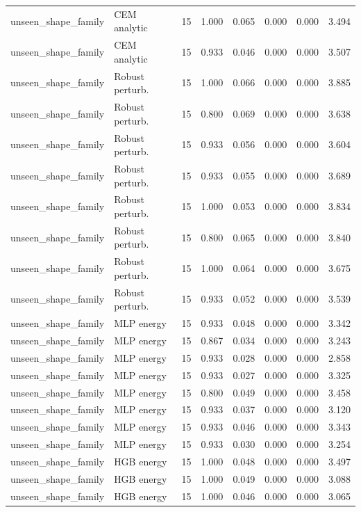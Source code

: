 {\begin{longtable}{llrrrrrr}
unseen\_shape\_family & CEM analytic & 15 & 1.000 & 0.065 & 0.000 & 0.000 & 3.494 \\
unseen\_shape\_family & CEM analytic & 15 & 0.933 & 0.046 & 0.000 & 0.000 & 3.507 \\
unseen\_shape\_family & Robust perturb. & 15 & 1.000 & 0.066 & 0.000 & 0.000 & 3.885 \\
unseen\_shape\_family & Robust perturb. & 15 & 0.800 & 0.069 & 0.000 & 0.000 & 3.638 \\
unseen\_shape\_family & Robust perturb. & 15 & 0.933 & 0.056 & 0.000 & 0.000 & 3.604 \\
unseen\_shape\_family & Robust perturb. & 15 & 0.933 & 0.055 & 0.000 & 0.000 & 3.689 \\
unseen\_shape\_family & Robust perturb. & 15 & 1.000 & 0.053 & 0.000 & 0.000 & 3.834 \\
unseen\_shape\_family & Robust perturb. & 15 & 0.800 & 0.065 & 0.000 & 0.000 & 3.840 \\
unseen\_shape\_family & Robust perturb. & 15 & 1.000 & 0.064 & 0.000 & 0.000 & 3.675 \\
unseen\_shape\_family & Robust perturb. & 15 & 0.933 & 0.052 & 0.000 & 0.000 & 3.539 \\
unseen\_shape\_family & MLP energy & 15 & 0.933 & 0.048 & 0.000 & 0.000 & 3.342 \\
unseen\_shape\_family & MLP energy & 15 & 0.867 & 0.034 & 0.000 & 0.000 & 3.243 \\
unseen\_shape\_family & MLP energy & 15 & 0.933 & 0.028 & 0.000 & 0.000 & 2.858 \\
unseen\_shape\_family & MLP energy & 15 & 0.933 & 0.027 & 0.000 & 0.000 & 3.325 \\
unseen\_shape\_family & MLP energy & 15 & 0.800 & 0.049 & 0.000 & 0.000 & 3.458 \\
unseen\_shape\_family & MLP energy & 15 & 0.933 & 0.037 & 0.000 & 0.000 & 3.120 \\
unseen\_shape\_family & MLP energy & 15 & 0.933 & 0.046 & 0.000 & 0.000 & 3.343 \\
unseen\_shape\_family & MLP energy & 15 & 0.933 & 0.030 & 0.000 & 0.000 & 3.254 \\
unseen\_shape\_family & HGB energy & 15 & 1.000 & 0.048 & 0.000 & 0.000 & 3.497 \\
unseen\_shape\_family & HGB energy & 15 & 1.000 & 0.049 & 0.000 & 0.000 & 3.088 \\
unseen\_shape\_family & HGB energy & 15 & 1.000 & 0.046 & 0.000 & 0.000 & 3.065 \\

\end{longtable}}
